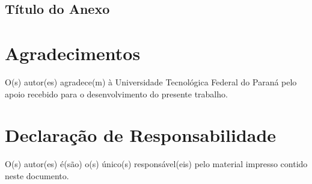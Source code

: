 \documentclass[%
  article,%
  10pt,%
  a4paper,%
  fleqn,%
  oneside,%
  sumario = tradicional,%
  chapter = TITLE,%
  section = TITLE,%
]{abntex2}
\begin{document}
\begin{ambienteanexos}%

\chapter{Título do Anexo}\label{cap:anexoa}

\lipsum[21-25]

\end{ambienteanexos}

\chapter*{Agradecimentos}

O(s) autor(es) agradece(m) à Universidade Tecnológica Federal do Paraná pelo apoio recebido para o desenvolvimento do presente trabalho.

\chapter*{Declaração de Responsabilidade}

O(s) autor(es) é(são) o(s) único(s) responsável(eis) pelo material impresso contido neste documento.

\end{document}
